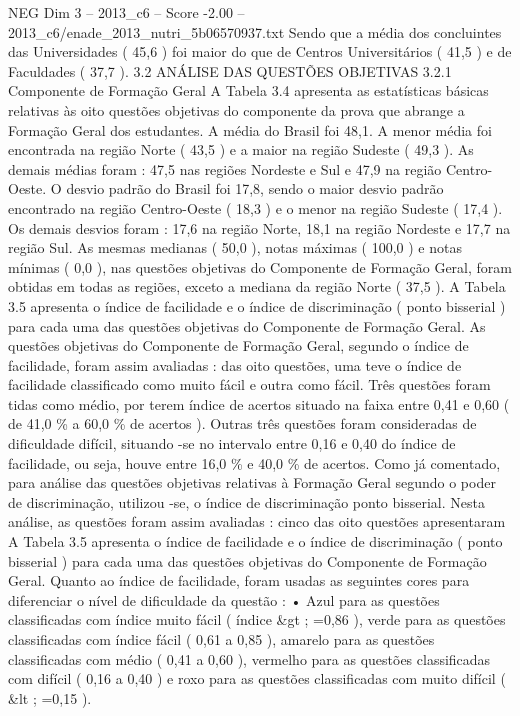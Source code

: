 \begin{textsample}{NEG Dim 3 – 2013\_c6 – Score -2.00 – 2013\_c6/enade\_2013\_nutri\_5b06570937.txt}
Sendo que a média dos concluintes das Universidades ( 45,6 ) foi maior do que de Centros Universitários ( 41,5 ) e de Faculdades ( 37,7 ). 3.2 ANÁLISE DAS QUESTÕES OBJETIVAS 3.2.1 Componente de Formação Geral A Tabela 3.4 apresenta as estatísticas básicas relativas às oito questões objetivas do componente da prova que abrange a Formação Geral dos estudantes.
A média do Brasil foi 48,1.
A menor média foi encontrada na região Norte ( 43,5 ) e a maior na região Sudeste ( 49,3 ).
As demais médias foram : 47,5 nas regiões Nordeste e Sul e 47,9 na região Centro-Oeste.
O desvio padrão do Brasil foi 17,8, sendo o maior desvio padrão encontrado na região Centro-Oeste ( 18,3 ) e o menor na região Sudeste ( 17,4 ).
Os demais desvios foram : 17,6 na região Norte, 18,1 na região Nordeste e 17,7 na região Sul.
As mesmas medianas ( 50,0 ), notas máximas ( 100,0 ) e notas mínimas ( 0,0 ), nas questões objetivas do Componente de Formação Geral, foram obtidas em todas as regiões, exceto a mediana da região Norte ( 37,5 ).
A Tabela 3.5 apresenta o índice de facilidade e o índice de discriminação ( ponto bisserial ) para cada uma das questões objetivas do Componente de Formação Geral.
As questões objetivas do Componente de Formação Geral, segundo o índice de facilidade, foram assim avaliadas : das oito questões, uma teve o índice de facilidade classificado como muito fácil e outra como fácil.
Três questões foram tidas como médio, por terem índice de acertos situado na faixa entre 0,41 e 0,60 ( de 41,0 \% a 60,0 \% de acertos ).
Outras três questões foram consideradas de dificuldade difícil, situando -se no intervalo entre 0,16 e 0,40 do índice de facilidade, ou seja, houve entre 16,0 \% e 40,0 \% de acertos.
Como já comentado, para análise das questões objetivas relativas à Formação Geral segundo o poder de discriminação, utilizou -se, o índice de discriminação ponto bisserial.
Nesta análise, as questões foram assim avaliadas : cinco das oito questões apresentaram A Tabela 3.5 apresenta o índice de facilidade e o índice de discriminação ( ponto bisserial ) para cada uma das questões objetivas do Componente de Formação Geral.
Quanto ao índice de facilidade, foram usadas as seguintes cores para diferenciar o nível de dificuldade da questão : • Azul para as questões classificadas com índice muito fácil ( índice \&gt ; =0,86 ), verde para as questões classificadas com índice fácil ( 0,61 a 0,85 ), amarelo para as questões classificadas com médio ( 0,41 a 0,60 ), vermelho para as questões classificadas com difícil ( 0,16 a 0,40 ) e roxo para as questões classificadas com muito difícil ( \&lt ; =0,15 ).

\end{textsample}
